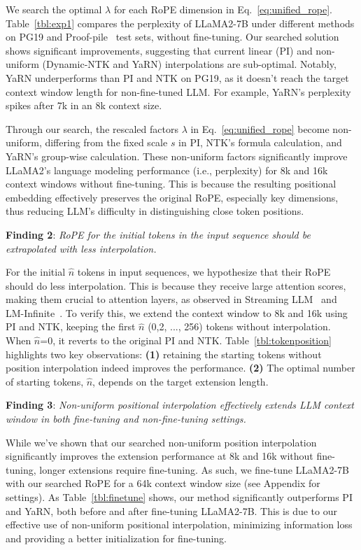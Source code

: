 We  search the optimal $\lambda$ for each RoPE dimension in Eq.~\ref{eq:unified_rope}. Table~\ref{tbl:exp1} compares the perplexity of LLaMA2-7B under different  methods on PG19 and Proof-pile~\cite{proof-pile} test sets, without fine-tuning. Our searched solution shows significant improvements, suggesting that current linear (PI) and non-uniform (Dynamic-NTK and YaRN) interpolations are sub-optimal. Notably, YaRN underperforms  than PI and NTK on PG19, as it doesn't reach the target context window length for non-fine-tuned LLM. For example, YaRN's perplexity spikes after 7k in an 8k context size. 

Through our search,  the rescaled factors $\lambda$ in Eq.~\ref{eq:unified_rope} become non-uniform, differing from the fixed scale $s$ in PI, NTK's formula calculation, and YaRN's group-wise calculation. These non-uniform factors significantly improve LLaMA2's language modeling performance (i.e., perplexity) for 8k and 16k context windows without fine-tuning. This is because the resulting positional embedding effectively preserves the original RoPE, especially key dimensions, thus reducing LLM's difficulty in distinguishing close token positions.

\textbf{Finding 2}: \textit{RoPE for the initial tokens in the input sequence should be extrapolated with less interpolation.} 

For the initial $\hat{n}$ tokens in input sequences, we hypothesize that their RoPE should do less interpolation. This is because they receive large attention scores, making them crucial to attention layers, as observed in  Streaming LLM~\cite{streamingllm} and LM-Infinite~\cite{han2023lminfinite}. To verify this, we extend the context window to 8k and 16k using PI and NTK, keeping the first  $\hat n$ (0,2, ..., 256) tokens without interpolation. When $\hat n$=0, it reverts to the original PI and NTK. Table~\ref{tbl:tokenposition} highlights two key observations: \textbf{(1)} retaining the starting tokens without position interpolation indeed improves the performance. \textbf{(2)} The optimal number of starting tokens, $\hat n$, depends on the target extension length. 

\textbf{Finding 3}: \textit{Non-uniform positional interpolation effectively extends LLM context window in both fine-tuning and non-fine-tuning settings.} 

While we've shown that our searched non-uniform position interpolation significantly improves the extension performance at 8k and 16k without fine-tuning, longer extensions require fine-tuning. As such, we fine-tune LLaMA2-7B with our searched RoPE for a 64k context window size (see Appendix for settings). As Table~\ref{tbl:finetune} shows, our method significantly outperforms PI and YaRN, both before and after fine-tuning LLaMA2-7B. This is due to our effective use of non-uniform positional interpolation, minimizing information loss and providing a better initialization for fine-tuning.

